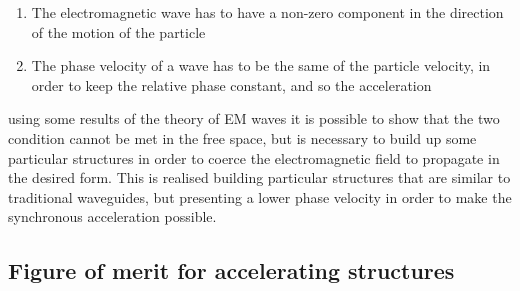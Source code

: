 \begin{enumerate}
\item The electromagnetic wave has to have a non-zero component in the direction of the motion of the particle
\item The phase velocity of a wave has to be the same of the particle velocity, in order to keep the relative phase constant, and so the acceleration
\end{enumerate}
using some results of the theory of EM waves it is possible to show that the two condition cannot be met in the free space, but is necessary to build up some particular structures in order to coerce the electromagnetic field to propagate in the desired form. This is realised building particular structures that are similar to traditional waveguides, but presenting a lower phase velocity in order to make the synchronous acceleration possible.




\subsection[Figure of merit for accelerating structures]{Figure of merit for accelerating structures}

